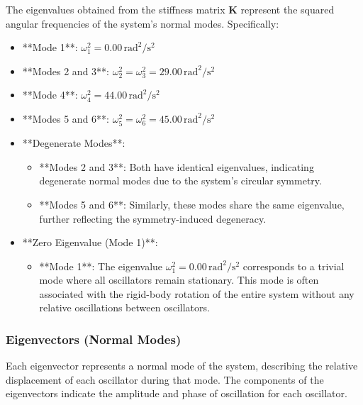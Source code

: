 \documentclass[12pt]{report} %
\begin{document}
The eigenvalues obtained from the stiffness matrix \( \mathbf{K} \) represent the squared angular frequencies of the system's normal modes. Specifically:

\begin{itemize}
    \item **Mode 1**: \( \omega_1^2 = 0.00 \, \text{rad}^2/\text{s}^2 \)
    \item **Modes 2 and 3**: \( \omega_2^2 = \omega_3^2 = 29.00 \, \text{rad}^2/\text{s}^2 \)
    \item **Mode 4**: \( \omega_4^2 = 44.00 \, \text{rad}^2/\text{s}^2 \)
    \item **Modes 5 and 6**: \( \omega_5^2 = \omega_6^2 = 45.00 \, \text{rad}^2/\text{s}^2 \)
\end{itemize}

\begin{itemize}
    \item **Degenerate Modes**:
    \begin{itemize}
        \item **Modes 2 and 3**: Both have identical eigenvalues, indicating degenerate normal modes due to the system's circular symmetry.
        \item **Modes 5 and 6**: Similarly, these modes share the same eigenvalue, further reflecting the symmetry-induced degeneracy.
    \end{itemize}
    
    \item **Zero Eigenvalue (Mode 1)**:
    \begin{itemize}
        \item **Mode 1**: The eigenvalue \( \omega_1^2 = 0.00 \, \text{rad}^2/\text{s}^2 \) corresponds to a trivial mode where all oscillators remain stationary. This mode is often associated with the rigid-body rotation of the entire system without any relative oscillations between oscillators.
    \end{itemize}
\end{itemize}

\subsubsection{Eigenvectors (Normal Modes)}
\label{subsubsec:part2_task2_eigenvectors}

Each eigenvector represents a normal mode of the system, describing the relative displacement of each oscillator during that mode. The components of the eigenvectors indicate the amplitude and phase of oscillation for each oscillator.
\end{document}
